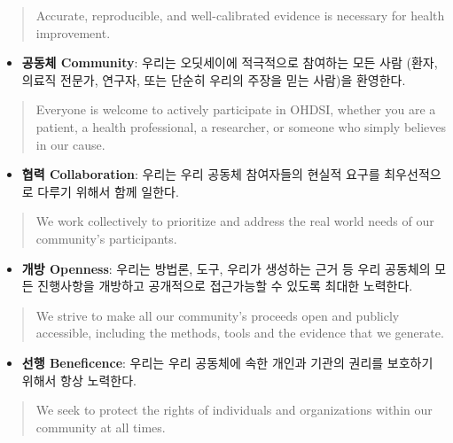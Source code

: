\documentclass[11pt]{book}
\providecommand{\tightlist}{%
  \setlength{\itemsep}{0pt}\setlength{\parskip}{0pt}}
\theoremstyle{definition}
\theoremstyle{definition}
\theoremstyle{definition}
\theoremstyle{remark}
\begin{document}
\begin{quote}
Accurate, reproducible, and well-calibrated evidence is necessary for
health improvement.
\end{quote}

\begin{itemize}
\tightlist
\item
  \textbf{공동체 Community}: 우리는 오딧세이에 적극적으로 참여하는 모든
  사람 (환자, 의료직 전문가, 연구자, 또는 단순히 우리의 주장을 믿는
  사람)을 환영한다.
\end{itemize}

\begin{quote}
Everyone is welcome to actively participate in OHDSI, whether you are a
patient, a health professional, a researcher, or someone who simply
believes in our cause.
\end{quote}

\begin{itemize}
\tightlist
\item
  \textbf{협력 Collaboration}: 우리는 우리 공동체 참여자들의 현실적
  요구를 최우선적으로 다루기 위해서 함께 일한다.
\end{itemize}

\begin{quote}
We work collectively to prioritize and address the real world needs of
our community's participants.
\end{quote}

\begin{itemize}
\tightlist
\item
  \textbf{개방 Openness}: 우리는 방법론, 도구, 우리가 생성하는 근거 등
  우리 공동체의 모든 진행사항을 개방하고 공개적으로 접근가능할 수 있도록
  최대한 노력한다.
\end{itemize}

\begin{quote}
We strive to make all our community's proceeds open and publicly
accessible, including the methods, tools and the evidence that we
generate.
\end{quote}

\begin{itemize}
\tightlist
\item
  \textbf{선행 Beneficence}: 우리는 우리 공동체에 속한 개인과 기관의
  권리를 보호하기 위해서 항상 노력한다.
\end{itemize}

\begin{quote}
We seek to protect the rights of individuals and organizations within
our community at all times.
\end{quote}
\end{document}

